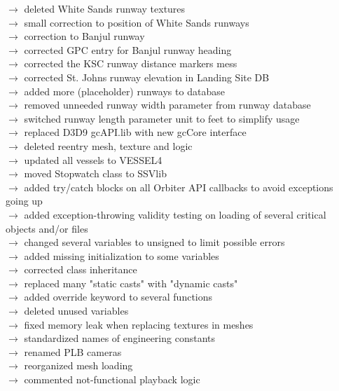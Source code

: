 \documentclass[Space_Shuttle_Vessel_Manual.tex]{subfiles}
\begin{document}
$\rightarrow$ deleted White Sands runway textures\\
$\rightarrow$ small correction to position of White Sands runways\\
$\rightarrow$ correction to Banjul runway\\
$\rightarrow$ corrected GPC entry for Banjul runway heading\\
$\rightarrow$ corrected the KSC runway distance markers mess \\
$\rightarrow$ corrected St. Johns runway elevation in Landing Site DB\\
$\rightarrow$ added more (placeholder) runways to database\\
$\rightarrow$ removed unneeded runway width parameter from runway database\\
$\rightarrow$ switched runway length parameter unit to feet to simplify usage\\
$\rightarrow$ replaced D3D9 gcAPI.lib with new gcCore interface\\
$\rightarrow$ deleted reentry mesh, texture and logic\\
$\rightarrow$ updated all vessels to VESSEL4\\
$\rightarrow$ moved Stopwatch class to SSVlib\\
$\rightarrow$ added try/catch blocks on all Orbiter API callbacks to avoid exceptions going up\\
$\rightarrow$ added exception-throwing validity testing on loading of several critical objects and/or files\\
$\rightarrow$ changed several variables to unsigned to limit possible errors\\
$\rightarrow$ added missing initialization to some variables\\
$\rightarrow$ corrected class inheritance\\
$\rightarrow$ replaced many "static casts" with "dynamic casts"\\
$\rightarrow$ added override keyword to several functions\\
$\rightarrow$ deleted unused variables\\
$\rightarrow$ fixed memory leak when replacing textures in meshes\\
$\rightarrow$ standardized names of engineering constants\\
$\rightarrow$ renamed PLB cameras\\
$\rightarrow$ reorganized mesh loading\\
$\rightarrow$ commented not-functional playback logic\\
\end{document}
